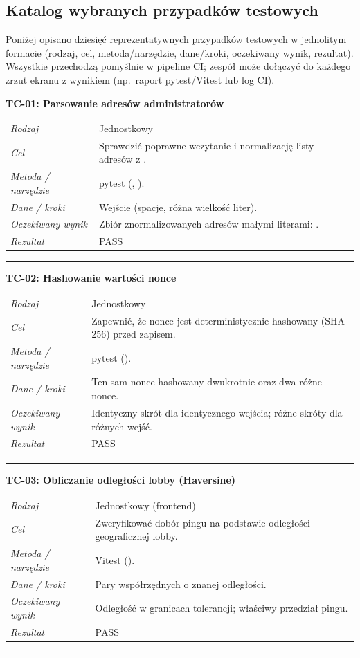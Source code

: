 \subsection{Katalog wybranych przypadków testowych}
\label{sec:katalog}

Poniżej opisano dziesięć reprezentatywnych przypadków testowych w jednolitym formacie
(rodzaj, cel, metoda/narzędzie, dane/kroki, oczekiwany wynik, rezultat). Wszystkie
przechodzą pomyślnie w pipeline CI; zespół może dołączyć do każdego zrzut ekranu
z wynikiem (np.\ raport pytest/Vitest lub log CI).

\newcommand{\tc}[7]{%
  \par\vspace{0.5em}\noindent\textbf{#1}\par\nopagebreak\vspace{0.2em}
  \noindent\begin{tabular}{@{}>{\itshape}p{0.20\textwidth}p{0.74\textwidth}@{}}
  Rodzaj & #2 \\
  Cel & #3 \\
  Metoda / narzędzie & #4 \\
  Dane / kroki & #5 \\
  Oczekiwany wynik & #6 \\
  Rezultat & #7 \\
  \end{tabular}\par\vspace{0.3em}\noindent\rule{\textwidth}{0.4pt}}

\tc{TC-01: Parsowanie adresów administratorów}
{Jednostkowy}
{Sprawdzić poprawne wczytanie i normalizację listy adresów z \code{ADMIN_ADDRESSES}.}
{pytest (\code{test_helpers.py}, \code{_parse_admin_addresses}).}
{Wejście \code{" 0xABC , 0xdef "} (spacje, różna wielkość liter).}
{Zbiór znormalizowanych adresów małymi literami: \code{{0xabc, 0xdef}}.}
{PASS}

\tc{TC-02: Hashowanie wartości nonce}
{Jednostkowy}
{Zapewnić, że nonce jest deterministycznie hashowany (SHA-256) przed zapisem.}
{pytest (\code{hash_nonce}).}
{Ten sam nonce hashowany dwukrotnie oraz dwa różne nonce.}
{Identyczny skrót dla identycznego wejścia; różne skróty dla różnych wejść.}
{PASS}

\tc{TC-03: Obliczanie odległości lobby (Haversine)}
{Jednostkowy (frontend)}
{Zweryfikować dobór pingu na podstawie odległości geograficznej lobby.}
{Vitest (\code{lobbyLocations.test.ts}).}
{Pary współrzędnych o znanej odległości.}
{Odległość w granicach tolerancji; właściwy przedział pingu.}
{PASS}


